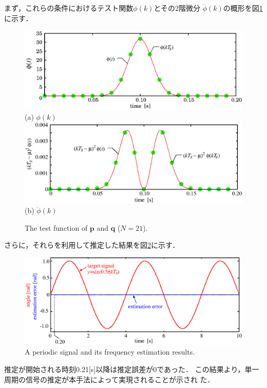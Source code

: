 \documentclass{ieej}
\begin{document}
まず，これらの条件におけるテスト関数$\phi(k)$とその2階微分
$\ddot{\phi}(k)$の概形を図\ref{fig:ddphi}に示す．
\begin{figure}[btp]
 \begin{center}
  \includegraphics[width=1.0\linewidth]{fig/phi2.eps}\\
  (a) $\phi(k)$\\
  \includegraphics[width=1.0\linewidth]{fig/ddphi2.eps}\\
  (b) $\ddot{\phi}(k)$
 \end{center}
 \caption{The test function of $\mathbf{p}$ and $\mathbf{q}$ ($N=21$).}
 \label{fig:ddphi}
\end{figure}
さらに，それらを利用して推定した結果を図\ref{fig:sim2}に示す．
\begin{figure}[btp]
 \begin{center}
  \includegraphics[width=1.0\linewidth]{fig/sim2.eps}
 \end{center}
 \caption{A periodic signal and its frequency estimation results.}
 \label{fig:sim2}
\end{figure}
推定が開始される時刻0.21[s]以降は推定誤差が0であった．
この結果より，単一周期の信号の推定が本手法によって実現されることが示され
た．
\end{document}
